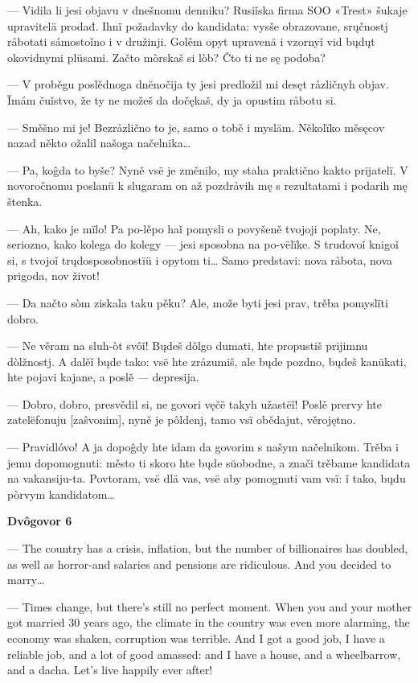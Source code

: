 — Vidila li jesi objavu v dnešnomu denniku? Rusiǐska firma SOO «Trest» šukaje upravitelä prodađ. Ihnï požadavky do kandidata: vysše obrazovane, srųčnostj råbotati sámostoǐno i v družinji. Golěm opyt upravenä i vzornyǐ vid bųdųt okovidnymi plüsami. Začto mòrskaš si lòb? Čto ti ne sę podoba?

— V proběgu poslědnoga dnënočija ty jesi predložil mi desęt råzličnyh objav. Ïmám čuǐstvo, že ty ne možeš da dočękaš, dy ja opustim råbotu si.

— Směšno mi je! Bezråzlično to je, samo o tobě i mysläm. Několïko měsęcov nazad někto ožalil našoga načelnika…

— Pa, koĝda to byše? Nyně vsë je změnilo, my staha praktično kakto prijatelï. V novoročnomu poslanü k slugaram on až pozdråvih mę s rezultatami i podarih mę štenka.

— Ah, kako je mïlo! Pa po-lěpo haǐ pomysli o povyšeně tvojoji poplaty. Ne, seriozno, kako kolega do kolegy — jesi sposobna na po-vëlïke. S trudovoǐ knigoǐ si, s tvojoǐ trųdosposobnostïü i opytom ti… Samo predstavi: nova råbota, nova prigoda, nov život!

— Da načto sòm ziskala taku pěku? Ale, može byti jesi prav, trěba pomyslïti dobro.

— Ne věram na sluh-òt svôǐ! Bųdeš dôlgo dumati, hte propustiš prijimnu dòlžnostj. A dalěǐ bųde tako: vsë hte zråzumiš, ale bųde pozdno, bųdeš kanükati, hte pojavi kajane, a poslě — depresija.

— Dobro, dobro, presvědil si, ne govori vęčë takyh užastëǐ! Poslě prervy hte zatelëfonuju [zaŝvonim], nyně je pôldenj, tamo vsï obědajut, věrojętno.

— Pravidlóvo! A ja dopoĝdy hte idam da govorim s našym načelnikom. Trěba i jemu dopomognuti: město ti skoro hte bųde sŭobodne, a znači trěbame kandidata na vakansiju-ta. Povtoram, vsë dlä vas, vsë aby pomognuti vam vsï: ǐ tako, bųdu pòrvym kandidatom…


\textbf{Dvôgovor 6}

— The country has a crisis, inflation, but the number of billionaires has doubled, as well as horror-and salaries and pensions are ridiculous. And you decided to marry…

— Times change, but there’s still no perfect moment. When you and your mother got married 30 years ago, the climate in the country was even more alarming, the economy was shaken, corruption was terrible. And I got a good job, I have a reliable job, and a lot of good amassed: and I have a house, and a wheelbarrow, and a dacha. Let’s live happily ever after!

